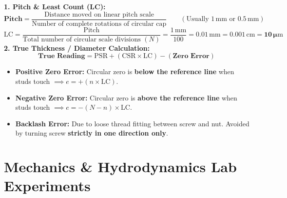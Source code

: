 \documentclass[10pt,a4paper]{article}
\begin{document}
\begin{formulabox}
\textbf{1. Pitch \& Least Count (LC):}
\begin{equation}
  \mathbf{\text{Pitch}} = \frac{\text{Distance moved on linear pitch scale}}{\text{Number of complete rotations of circular cap}} \qquad (\text{Usually } 1\,\mathrm{mm} \text{ or } 0.5\,\mathrm{mm})
\end{equation}
\begin{equation}
  \mathbf{\mathrm{LC}} = \frac{\text{Pitch}}{\text{Total number of circular scale divisions } (N)} = \frac{1\,\mathrm{mm}}{100} = \mathbf{0.01\,\mathrm{mm} = 0.001\,\mathrm{cm} = 10\,\mu\mathrm{m}}
\end{equation}
\textbf{2. True Thickness / Diameter Calculation:}
\begin{equation}
  \mathbf{\text{True Reading} = \mathrm{PSR} + (\mathrm{CSR} \times \mathrm{LC}) - (\text{Zero Error})}
\end{equation}
\begin{itemize}
  \item \textbf{Positive Zero Error:} Circular zero is \textbf{below the reference line} when studs touch $\implies e = +(n \times \mathrm{LC})$.
  \item \textbf{Negative Zero Error:} Circular zero is \textbf{above the reference line} when studs touch $\implies e = -(N - n) \times \mathrm{LC}$.
  \item \textbf{Backlash Error:} Due to loose thread fitting between screw and nut. Avoided by turning screw \textbf{strictly in one direction only}.
\end{itemize}
\end{formulabox}

\section{Mechanics \& Hydrodynamics Lab Experiments}
\end{document}
